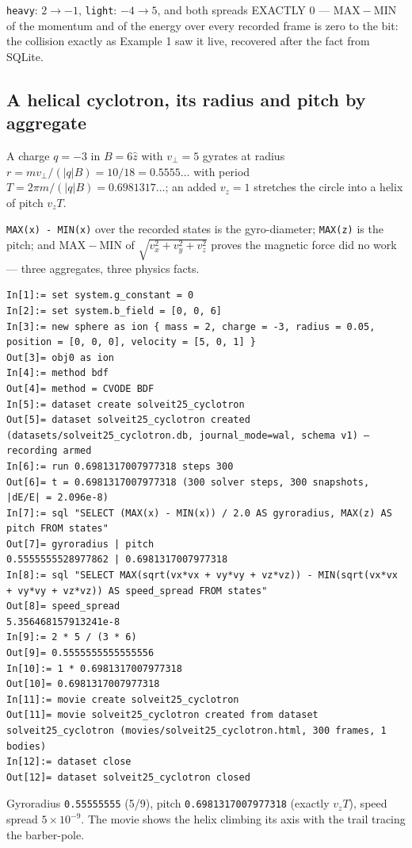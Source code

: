 \documentclass[11pt]{article}
\newcommand{\code}[1]{\texttt{#1}}
\begin{document}
\code{heavy}: $2 \to -1$, \code{light}: $-4 \to 5$, and both spreads
EXACTLY 0 --- $\mathrm{MAX}-\mathrm{MIN}$ of the momentum and of the
energy over every recorded frame is zero to the bit: the collision
exactly as Example 1 saw it live, recovered after the fact from SQLite.

\subsection{A helical cyclotron, its radius and pitch by aggregate}

A charge $q = -3$ in $B = 6\hat z$ with $v_\perp = 5$ gyrates at
radius $r = m v_\perp/(|q|B) = 10/18 = 0.5555\dots$ with period
$T = 2\pi m/(|q|B) = 0.6981317\dots$; an added $v_z = 1$ stretches the
circle into a helix of pitch $v_z T$.

\code{MAX(x) - MIN(x)} over the recorded states is the gyro-diameter;
\code{MAX(z)} is the pitch; and $\mathrm{MAX}-\mathrm{MIN}$ of
$\sqrt{v_x^2+v_y^2+v_z^2}$ proves the magnetic force did no work ---
three aggregates, three physics facts.

\begin{lstlisting}
In[1]:= set system.g_constant = 0
In[2]:= set system.b_field = [0, 0, 6]
In[3]:= new sphere as ion { mass = 2, charge = -3, radius = 0.05, position = [0, 0, 0], velocity = [5, 0, 1] }
Out[3]= obj0 as ion
In[4]:= method bdf
Out[4]= method = CVODE BDF
In[5]:= dataset create solveit25_cyclotron
Out[5]= dataset solveit25_cyclotron created (datasets/solveit25_cyclotron.db, journal_mode=wal, schema v1) — recording armed
In[6]:= run 0.6981317007977318 steps 300
Out[6]= t = 0.6981317007977318 (300 solver steps, 300 snapshots, |dE/E| = 2.096e-8)
In[7]:= sql "SELECT (MAX(x) - MIN(x)) / 2.0 AS gyroradius, MAX(z) AS pitch FROM states"
Out[7]= gyroradius | pitch
0.5555555528977862 | 0.6981317007977318
In[8]:= sql "SELECT MAX(sqrt(vx*vx + vy*vy + vz*vz)) - MIN(sqrt(vx*vx + vy*vy + vz*vz)) AS speed_spread FROM states"
Out[8]= speed_spread
5.356468157913241e-8
In[9]:= 2 * 5 / (3 * 6)
Out[9]= 0.5555555555555556
In[10]:= 1 * 0.6981317007977318
Out[10]= 0.6981317007977318
In[11]:= movie create solveit25_cyclotron
Out[11]= movie solveit25_cyclotron created from dataset solveit25_cyclotron (movies/solveit25_cyclotron.html, 300 frames, 1 bodies)
In[12]:= dataset close
Out[12]= dataset solveit25_cyclotron closed
\end{lstlisting}

Gyroradius \code{0.55555555} (5/9), pitch \code{0.6981317007977318}
(exactly $v_z T$), speed spread $5\times10^{-9}$. The movie shows the
helix climbing its axis with the trail tracing the barber-pole.
\end{document}
